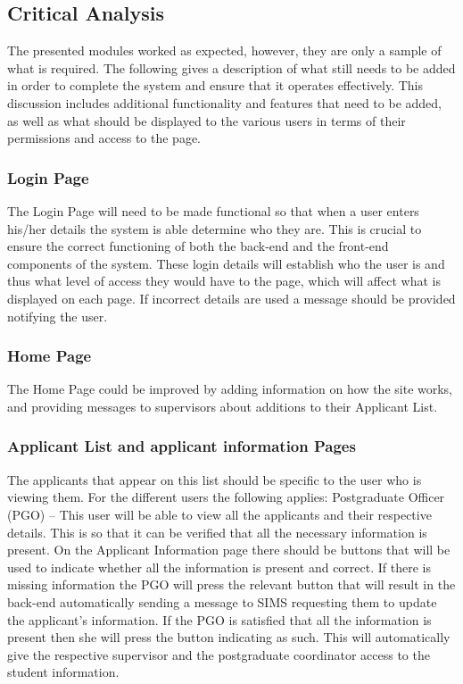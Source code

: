\documentclass[journal]{IEEEtran}
\begin{document}
\subsection{Critical Analysis}
The presented modules worked as expected, however, they are only a sample of what is required. The following gives a description of what still needs to be added in order to complete the system and ensure that it operates effectively. This discussion includes additional functionality and features that need to be added, as well as what should be displayed to the various users in terms of their permissions and access to the page.
\hfill \break \subsubsection{Login Page}
The Login Page will need to be made functional so that when a user enters his/her details the system is able determine who they are. This is crucial to ensure the correct functioning of both the back-end and the front-end components of the system. These login details will establish who the user is and thus what level of access they would have to the page, which will affect what is displayed on each page. If incorrect details are used a message should be provided notifying the user.
\hfill \break \subsubsection{Home Page}
The Home Page could be improved by adding information on how the site works, and providing messages to supervisors about additions to their Applicant List. 
\hfill \break \subsubsection{Applicant List and applicant information Pages}
The applicants that appear on this list should be specific to the user who is viewing them. For the different users the following applies:
\hfill \break Postgraduate Officer (PGO) – This user will be able to view all the applicants and their respective details. This is so that it can be verified that all the necessary information is present.  On the Applicant Information page there should be buttons that will be used to indicate whether all the information is present and correct. If there is missing information the PGO will press the relevant button that will result in the back-end automatically sending a message to SIMS requesting them to update the applicant's information. If the PGO is satisfied that all the information is present then she will press the button indicating as such. This will automatically give the respective supervisor and the postgraduate coordinator access to the student information.
\end{document}
